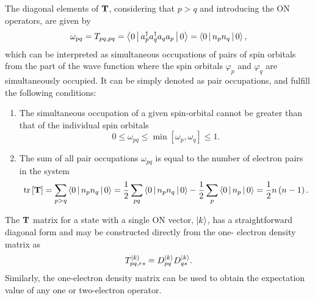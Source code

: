 The diagonal elements of $ \mat{T}$, considering that $p > q$ and introducing
the ON operators, are given by
\begin{equation}
    \omega_{pq} = T_{pq,pq} =
    \Braket{0 | a_p^{\dagger} a_q^{\dagger} a_q a_p | 0} =
    \Braket{0 | n_p n_q | 0},
\end{equation}
which can be interpreted as simultaneous occupations of pairs of spin orbitals
from the part of the wave function where the spin
orbitals $\varphi_p$ and $\varphi_q$ are simultaneously occupied.
It can be simply denoted as pair occupations, and fulfill the following conditions:
\begin{enumerate}
    \item The simultaneous occupation of a given spin-orbital cannot be greater than that
        of the individual spin orbitals
        \begin{equation}
            0 \le \omega_{pq} \le \min\left[ \omega_p, \omega_q \right] \le 1
            .
        \end{equation}

    \item The sum of all pair occupations $\omega_{pq}$ is equal to the number of
        electron pairs in the system 
        \begin{equation}
            \trace \left[ \mat{T} \right] =
            \sum_{p>q} \Braket{0 | n_p n_q | 0} =
            \frac{1}{2} \sum_{pq} \Braket{0 | n_p n_q | 0}
            - \frac{1}{2} \sum_{p} \Braket{0 | n_p | 0} =
            \frac{1}{2} n \left( n - 1 \right)
            .
        \end{equation}
\end{enumerate}

The $ \mat{T}$ matrix for a state with a single ON vector, $\Ket{k}$, has a 
straightforward diagonal form and may be constructed directly from the one-
electron density matrix as
\begin{equation}
    T_{pq,rs}^{\Ket{k}} = D_{pq}^{\Ket{k}} D_{qs}^{\Ket{k}}
    .
\end{equation}
Similarly, the one-electron density matrix can be used to obtain the 
expectation value of any one or two-electron operator.

